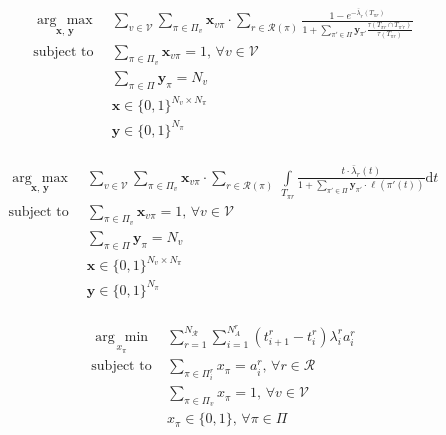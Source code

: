 \documentclass[letterpaper, 10pt, conference]{ieeeconf}
\newcommand{\argmin}[1]{\underset{#1}{\operatorname{arg}\,\operatorname{min}}\;}
\newcommand{\argmax}[1]{\underset{#1}{\operatorname{arg}\,\operatorname{max}}\;}
\newcommand{\Sum}[1]{\displaystyle\sum\limits_{#1}}
\newcommand{\Int}[1]{\displaystyle\int\limits_{#1}}
\newcommand{\bx}[0]{\ensuremath{\mathbf{x}}}
\newcommand{\by}[0]{\ensuremath{\mathbf{y}}}
\begin{document}
\begin{equation*}
\begin{array}{lll}
\argmax{\bx, \, \by}  & \Sum{v \in \mathcal{V}}
    \Sum{\pi \in \Pi_v} \bx_{v\pi} \cdot
    \Sum{r \in \mathcal{R}(\pi)}
    \frac{1 - e^{-\bar{\lambda}_r(T_{\pi r})}}
    {1 + \Sum{\pi' \in \Pi} \by_{\pi'} \frac{\tau(T_{\pi r} \cap T_{\pi' r})}
    {\tau(T_{\pi r})}}& \\
\text{subject to}
    & \Sum{\pi \in \Pi_v} \bx_{v\pi} = 1, \, \forall v \in \mathcal{V} \\
    & \Sum{\pi \in \Pi} \by_{\pi} = N_v \\
    & \bx \in \{0, 1\} ^ {N_v \times N_\pi} \\
    & \by \in \{0, 1\} ^ {N_\pi} \\

\end{array}
\end{equation*}

\begin{equation*}
\begin{array}{lll}
\argmax{\bx, \, \by}  & \Sum{v \in \mathcal{V}}
    \Sum{\pi \in \Pi_v} \bx_{v\pi} \cdot
    \Sum{r \in \mathcal{R}(\pi)} \,
    \Int{T_{\pi r}}
    \frac{t \cdot \bar{\lambda}_r(t)}
    {1 + \sum\limits_{\pi' \in \Pi} \by_{\pi'} \cdot \ell(\pi'(t))} \text{d}t& \\
\text{subject to}
    & \Sum{\pi \in \Pi_v} \bx_{v\pi} = 1, \, \forall v \in \mathcal{V} \\
    & \Sum{\pi \in \Pi} \by_{\pi} = N_v \\
    & \bx \in \{0, 1\} ^ {N_v \times N_\pi} \\
    & \by \in \{0, 1\} ^ {N_\pi} \\
\end{array}
\end{equation*}

\begin{equation*}
\begin{array}{lll}
\argmin{x_\pi}  & \Sum{r = 1}^{N_{\mathcal{R}}}
    \Sum{i = 1}^{N^r_A} (t^r_{i + 1} - t^r_i) \lambda^r_i a^r_i & \\
\text{subject to}
    & \Sum{\pi \in \Pi^r_i} x_{\pi} = a^r_i, \, \forall r \in \mathcal{R} \\
    & \Sum{\pi \in \Pi_v} x_{\pi} = 1, \, \forall v \in \mathcal{V} \\
    & x_\pi \in \{0, 1\}, \, \forall \pi \in \Pi
\end{array}
\end{equation*}





\end{document}
